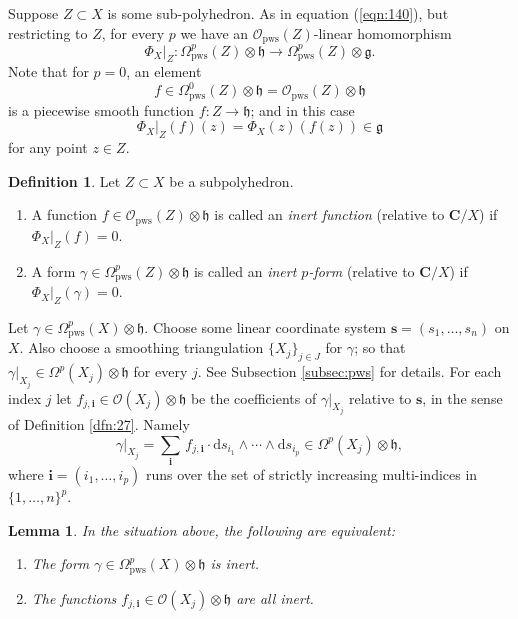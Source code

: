 \documentclass[10pt, a4paper]{amsart}
\newtheorem{lem}[equation]{Lemma}
\theoremstyle{definition}
\newtheorem{dfn}[equation]{Definition}
\numberwithin{equation}{section}
\newcommand{\rmitem}[1]{\item[\text{\textup{(#1)}}]}
\newcommand{\mfrak}[1]{\mathfrak{#1}}
\newcommand{\mcal}[1]{\mathcal{#1}}
\newcommand{\mbf}[1]{\mathbf{#1}}
\newcommand{\mrm}[1]{\mathrm{#1}}
\newcommand{\bsym}[1]{\boldsymbol{#1}}
\newcommand{\g}{\mfrak{g}}
\newcommand{\h}{\mfrak{h}}
\renewcommand{\d}{\mrm{d}}
\newcommand{\lb}{\linebreak}
\begin{document}
Suppose $Z \subset X$ is some sub-polyhedron.
As in equation (\ref{eqn:140}), but restricting to $Z$, for every $p$ we have an
$\mcal{O}_{\mrm{pws}}(Z)$-linear homomorphism
\[ \Phi_X|_Z : \Omega^p_{\mrm{pws}}(Z) \otimes \h \to 
\Omega^p_{\mrm{pws}}(Z) \otimes \g . \]
Note that for $p = 0$, an element 
\[ f \in \Omega^0_{\mrm{pws}}(Z) \otimes \h   = 
\mcal{O}_{\mrm{pws}}(Z) \otimes \h \]
is a piecewise smooth function $f : Z \to \h$; and in this case
\[ \Phi_X|_Z(f)(z) = \Phi_X(z)(f(z)) \in \g \]
for any point $z \in Z$. 

\begin{dfn} Let $Z \subset X$ be a subpolyhedron.
\begin{enumerate}
\item A function $f \in \mcal{O}_{\mrm{pws}}(Z) \otimes \h$ is called an {\em
inert function} (relative to $\mbf{C} / X$) if $\Phi_X|_Z(f) = 0$.

\item A form $\gamma \in  \Omega^p_{\mrm{pws}}(Z) \otimes \h$ is called an 
{\em inert $p$-form} 
(relative to $\mbf{C} / X$) if $\Phi_X|_Z(\gamma) = 0$.
\end{enumerate}
\end{dfn}

Let $\gamma \in \Omega^p_{\mrm{pws}}(X) \otimes \h$.
Choose some linear coordinate system 
$\bsym{s} = (s_1, \ldots, s_n)$ on $X$. Also choose a smoothing triangulation
$\{ X_j \}_{j \in J}$ for $\gamma$; so that 
$\gamma|_{X_j} \in \Omega^p(X_j) \otimes \h$ for every $j$. See Subsection 
\ref{subsec:pws} for details. For each index $j$ let 
$f_{j, \bsym{i}} \in \mcal{O}(X_j) \otimes \h$
be the coefficients of $\gamma|_{X_j}$ relative to $\bsym{s}$, in the sense of
Definition \ref{dfn:27}. Namely
\begin{equation} \label{eqn:222}
\gamma|_{X_j} = \sum_{\bsym{i}} \, f_{j, \bsym{i}} \cdot 
\d s_{i_1} \wedge \cdots \wedge \d s_{i_p} \in 
\Omega^p(X_j) \otimes \h ,
\end{equation}
where $\bsym{i} = (i_1, \ldots, i_p)$ runs over the set of strictly increasing
multi-indices in \lb $\{ 1, \ldots, n \}^p$.

\begin{lem} \label{lem:47}
In the situation above, the following are equivalent:
\begin{enumerate}
\rmitem{i} The form $\gamma \in \Omega^p_{\mrm{pws}}(X) \otimes \h$ is inert.
\rmitem{iii} The functions  
$f_{j, \bsym{i}} \in \mcal{O}(X_j) \otimes \h$ are all inert.
\end{enumerate}
\end{lem}
\end{document}
